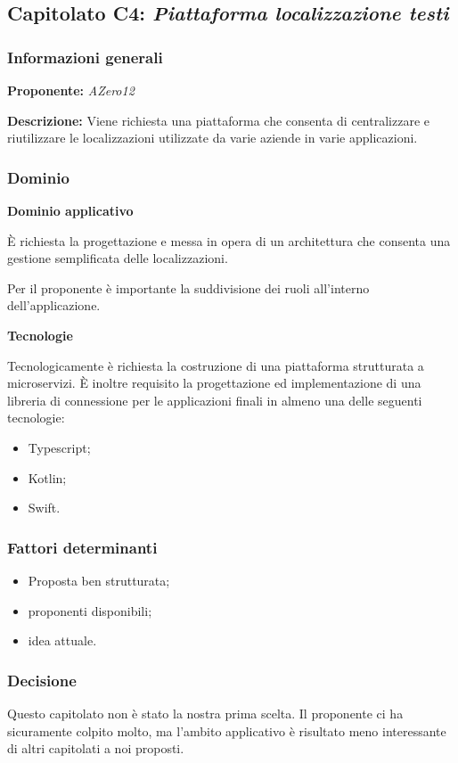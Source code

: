 \subsection{Capitolato C4: \textit{Piattaforma localizzazione testi}}

\subsubsection{Informazioni generali}

\textbf{Proponente:} \textit{AZero12}

\textbf{Descrizione:} Viene richiesta una piattaforma che consenta di centralizzare e riutilizzare le localizzazioni utilizzate da varie aziende in varie applicazioni. 
\subsubsection{Dominio}

\textbf{Dominio applicativo}

È richiesta la progettazione e messa in opera di un architettura che consenta una gestione semplificata delle localizzazioni.

Per il proponente è importante la suddivisione dei ruoli all'interno dell'applicazione.

\textbf{Tecnologie}

Tecnologicamente è richiesta la costruzione di una piattaforma strutturata a microservizi. È inoltre requisito la progettazione ed implementazione di una libreria di connessione per le applicazioni finali in almeno una delle seguenti tecnologie:
\begin{itemize}
    \item Typescript;
    \item Kotlin;
    \item Swift.
\end{itemize}

\subsubsection{Fattori determinanti}
\begin{itemize}
    \item Proposta ben strutturata;
    \item proponenti disponibili;
    \item idea attuale.
\end{itemize}

\subsubsection{Decisione}
Questo capitolato non è stato la nostra prima scelta. Il proponente ci ha sicuramente colpito molto, ma l'ambito applicativo è risultato meno interessante di altri capitolati a noi proposti.
